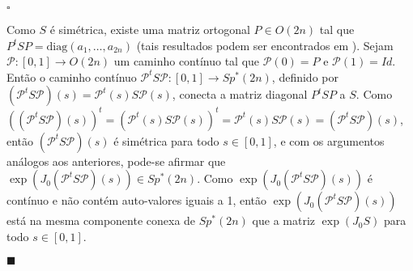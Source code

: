 \documentclass[12pt]{book}
\newenvironment{prova}[1]{$\square$ #1}{\hfill$\blacksquare$}
\newcommand{\diag}{\text{diag}}
\newcommand{\estruturacomplexa}{J_{0}}
\newcommand{\gruposimpleticonaodegenerado}[1]{Sp^{#1}(2n)}
\newcommand{\intervalo}{[0,1]}
\newcommand{\matrizortogonal}[1]{O(#1)}
\begin{document}
\begin{prova}
\begin{enumerate}
			Como $S$ é simétrica, existe uma matriz ortogonal $P \in \matrizortogonal{2n}$ tal que $P^{t}SP=\diag(a_{1},\dots,a_{2n})$ (tais resultados podem ser encontrados em \cite{hoffman_kunze}). Sejam $\mathcal{P}:[0,1]\to \matrizortogonal{2n}$ um caminho contínuo tal que $\mathcal{P}(0) = P$ e $\mathcal{P}(1)=Id$. 
			Então o caminho contínuo $\mathcal{P}^{t}S\mathcal{P}:\intervalo\to \gruposimpleticonaodegenerado{*}$, definido por $(\mathcal{P}^{t}S\mathcal{P})(s)=\mathcal{P}^{t}(s)S\mathcal{P}(s)$, conecta a matriz diagonal $P^{t}SP$ a $S$. Como $ ((\mathcal{P}^{t}S\mathcal{P})(s))^{t} =(\mathcal{P}^{t}(s)S\mathcal{P}(s))^{t} = \mathcal{P}^{t}(s)S\mathcal{P}(s) =(\mathcal{P}^{t}S\mathcal{P})(s)$, então $(\mathcal{P}^{t}S\mathcal{P})(s)$ é simétrica para todo $s\in \intervalo$, e com os argumentos análogos aos anteriores, pode-se afirmar que $\exp(\estruturacomplexa(\mathcal{P}^{t}S\mathcal{P})(s)) \in \gruposimpleticonaodegenerado{*}$. Como $\exp(\estruturacomplexa(\mathcal{P}^{t}S\mathcal{P})(s))$ é contínuo e não contém auto-valores iguais a 1, então $\exp(\estruturacomplexa(\mathcal{P}^{t}S\mathcal{P})(s))$ está na mesma componente conexa de $\gruposimpleticonaodegenerado{*}$ que a matriz $\exp(\estruturacomplexa S)$ para todo $s\in \intervalo$.
			

\end{enumerate}
\end{prova}
\end{document}
